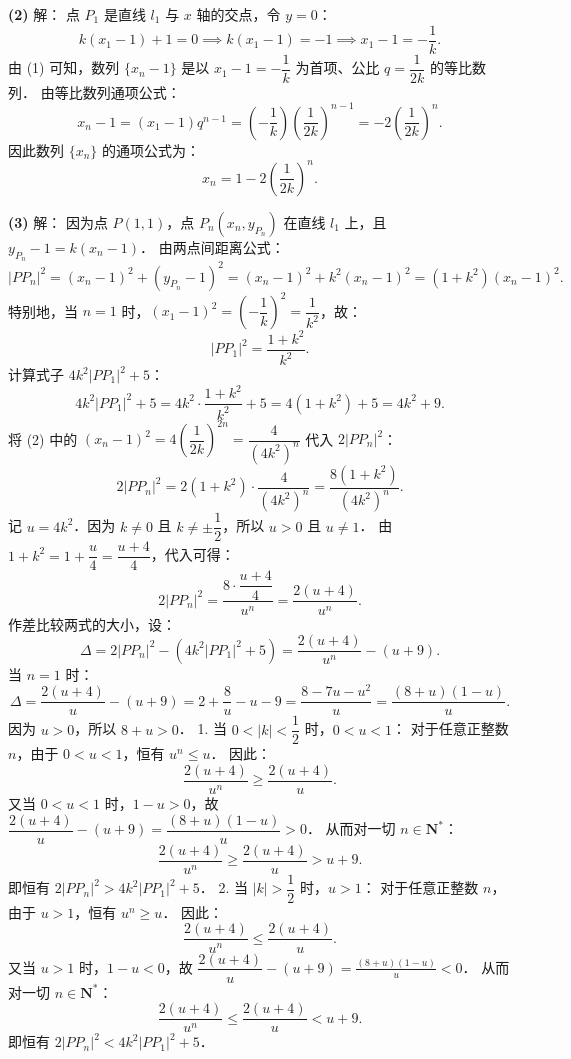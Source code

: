 \begin{answer}
\textbf{(2)} 解：
点 $P_1$ 是直线 $l_1$ 与 $x$ 轴的交点，令 $y = 0$：
\nopagebreak[4]
\[
k(x_1 - 1) + 1 = 0 \implies k(x_1 - 1) = -1 \implies x_1 - 1 = -\frac{1}{k}.
\]
由 (1) 可知，数列 $\{x_n - 1\}$ 是以 $x_1 - 1 = -\dfrac{1}{k}$ 为首项、公比 $q = \dfrac{1}{2k}$ 的等比数列．
由等比数列通项公式：
\nopagebreak[4]
\[
x_n - 1 = (x_1 - 1) q^{n-1} = \left(-\frac{1}{k}\right)\left(\frac{1}{2k}\right)^{n-1} = -2\left(\frac{1}{2k}\right)^n.
\]
因此数列 $\{x_n\}$ 的通项公式为：
\nopagebreak[4]
\[
x_n = 1 - 2\left(\frac{1}{2k}\right)^n.
\]

\textbf{(3)} 解：
因为点 $P(1, 1)$，点 $P_n(x_n, y_{P_n})$ 在直线 $l_1$ 上，且 $y_{P_n} - 1 = k(x_n - 1)$．
由两点间距离公式：
\nopagebreak[4]
\[
|PP_n|^2 = (x_n - 1)^2 + (y_{P_n} - 1)^2 = (x_n - 1)^2 + k^2(x_n - 1)^2 = (1 + k^2)(x_n - 1)^2.
\]
特别地，当 $n = 1$ 时，$(x_1 - 1)^2 = \left(-\dfrac{1}{k}\right)^2 = \dfrac{1}{k^2}$，故：
\nopagebreak[4]
\[
|PP_1|^2 = \frac{1 + k^2}{k^2}.
\]
计算式子 $4k^2|PP_1|^2 + 5$：
\nopagebreak[4]
\[
4k^2|PP_1|^2 + 5 = 4k^2 \cdot \frac{1 + k^2}{k^2} + 5 = 4(1 + k^2) + 5 = 4k^2 + 9.
\]
将 (2) 中的 $(x_n - 1)^2 = 4\left(\dfrac{1}{2k}\right)^{2n} = \dfrac{4}{(4k^2)^n}$ 代入 $2|PP_n|^2$：
\nopagebreak[4]
\[
2|PP_n|^2 = 2(1 + k^2) \cdot \frac{4}{(4k^2)^n} = \frac{8(1 + k^2)}{(4k^2)^n}.
\]
记 $u = 4k^2$．因为 $k \neq 0$ 且 $k \neq \pm \dfrac{1}{2}$，所以 $u > 0$ 且 $u \neq 1$．
由 $1 + k^2 = 1 + \dfrac{u}{4} = \dfrac{u + 4}{4}$，代入可得：
\nopagebreak[4]
\[
2|PP_n|^2 = \frac{8 \cdot \dfrac{u + 4}{4}}{u^n} = \frac{2(u + 4)}{u^n}.
\]
作差比较两式的大小，设：
\nopagebreak[4]
\[
\Delta = 2|PP_n|^2 - (4k^2|PP_1|^2 + 5) = \frac{2(u + 4)}{u^n} - (u + 9).
\]
当 $n = 1$ 时：
\nopagebreak[4]
\[
\Delta = \frac{2(u + 4)}{u} - (u + 9) = 2 + \frac{8}{u} - u - 9 = \frac{8 - 7u - u^2}{u} = \frac{(8 + u)(1 - u)}{u}.
\]
因为 $u > 0$，所以 $8 + u > 0$．
1. 当 $0 < |k| < \dfrac{1}{2}$ 时，$0 < u < 1$：
   对于任意正整数 $n$，由于 $0 < u < 1$，恒有 $u^n \leqslant u$．
   因此：
\nopagebreak[4]
\[
\frac{2(u + 4)}{u^n} \geqslant \frac{2(u + 4)}{u}.
\]
   又当 $0 < u < 1$ 时，$1 - u > 0$，故 $\dfrac{2(u + 4)}{u} - (u + 9) = \dfrac{(8 + u)(1 - u)}{u} > 0$．
   从而对一切 $n \in \mathbf{N}^*$：
\nopagebreak[4]
\[
\frac{2(u + 4)}{u^n} \geqslant \frac{2(u + 4)}{u} > u + 9.
\]
   即恒有 $2|PP_n|^2 > 4k^2|PP_1|^2 + 5$．
2. 当 $|k| > \dfrac{1}{2}$ 时，$u > 1$：
   对于任意正整数 $n$，由于 $u > 1$，恒有 $u^n \geqslant u$．
   因此：
\nopagebreak[4]
\[
\frac{2(u + 4)}{u^n} \leqslant \frac{2(u + 4)}{u}.
\]
   又当 $u > 1$ 时，$1 - u < 0$，故 $\dfrac{2(u + 4)}{u} - (u + 9) = \frac{(8 + u)(1 - u)}{u} < 0$．
   从而对一切 $n \in \mathbf{N}^*$：
\nopagebreak[4]
\[
\frac{2(u + 4)}{u^n} \leqslant \frac{2(u + 4)}{u} < u + 9.
\]
   即恒有 $2|PP_n|^2 < 4k^2|PP_1|^2 + 5$．


\end{answer}
